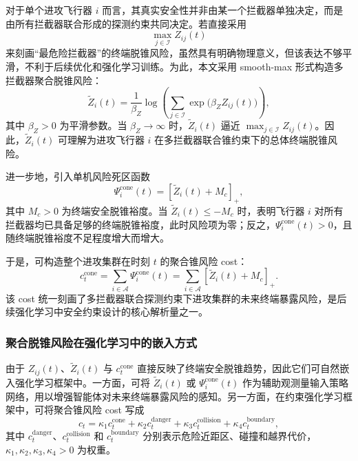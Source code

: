 对于单个进攻飞行器 $i$ 而言，其真实安全性并非由某一个拦截器单独决定，而是由所有拦截器联合形成的探测约束共同决定。若直接采用
\begin{equation}
\max_{j\in\mathcal{I}} Z_{ij}(t)
\end{equation}
来刻画“最危险拦截器”的终端脱锥风险，虽然具有明确物理意义，但该表达不够平滑，不利于后续优化和强化学习训练。为此，本文采用 smooth-max 形式构造多拦截器聚合脱锥风险：
\begin{equation}
\widetilde Z_i(t)
=
\frac{1}{\beta_Z}
\log\left(
\sum_{j\in\mathcal{I}}
\exp\!\bigl(\beta_Z Z_{ij}(t)\bigr)
\right),
\end{equation}
其中 $\beta_Z>0$ 为平滑参数。当 $\beta_Z\to\infty$ 时，$\widetilde Z_i(t)$ 逼近 $\max_{j\in\mathcal{I}} Z_{ij}(t)$。因此，$\widetilde Z_i(t)$ 可理解为进攻飞行器 $i$ 在多拦截器联合锥约束下的总体终端脱锥风险。

进一步地，引入单机风险死区函数
\begin{equation}
\Psi_i^{\mathrm{cone}}(t)
=
[\widetilde Z_i(t)+M_c]_+,
\end{equation}
其中 $M_c>0$ 为终端安全脱锥裕度。当 $\widetilde Z_i(t)\le -M_c$ 时，表明飞行器 $i$ 对所有拦截器均已具备足够的终端脱锥裕度，此时风险项为零；反之，$\Psi_i^{\mathrm{cone}}(t)>0$，且随终端脱锥裕度不足程度增大而增大。

于是，可构造整个进攻集群在时刻 $t$ 的聚合锥风险 cost：
\begin{equation}
c_t^{\mathrm{cone}}
=
\sum_{i\in\mathcal{A}}
\Psi_i^{\mathrm{cone}}(t)
=
\sum_{i\in\mathcal{A}}
[\widetilde Z_i(t)+M_c]_+.
\end{equation}
该 cost 统一刻画了多拦截器联合探测约束下进攻集群的未来终端暴露风险，是后续强化学习中安全约束设计的核心解析量之一。

\subsubsection{聚合脱锥风险在强化学习中的嵌入方式}

由于 $Z_{ij}(t)$、$\widetilde Z_i(t)$ 与 $c_t^{\mathrm{cone}}$ 直接反映了终端安全脱锥趋势，因此它们可自然嵌入强化学习框架中。一方面，可将 $\widetilde Z_i(t)$ 或 $\Psi_i^{\mathrm{cone}}(t)$ 作为辅助观测量输入策略网络，用以增强智能体对未来终端暴露风险的感知。另一方面，在约束强化学习框架中，可将聚合锥风险 cost 写成
\begin{equation}
c_t
=
\kappa_1 c_t^{\mathrm{cone}}
+
\kappa_2 c_t^{\mathrm{danger}}
+
\kappa_3 c_t^{\mathrm{collision}}
+
\kappa_4 c_t^{\mathrm{boundary}},
\end{equation}
其中 $c_t^{\mathrm{danger}}$、$c_t^{\mathrm{collision}}$ 和 $c_t^{\mathrm{boundary}}$ 分别表示危险近距区、碰撞和越界代价，$\kappa_1,\kappa_2,\kappa_3,\kappa_4>0$ 为权重。

